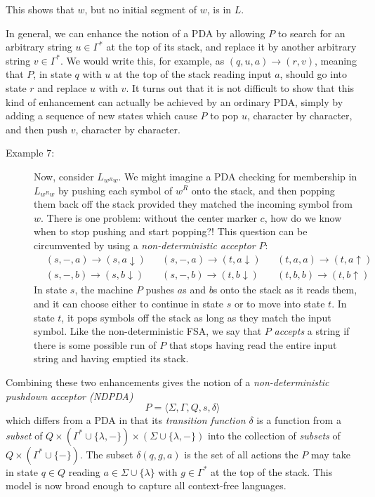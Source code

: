 \documentclass{article}
\begin{document}
\begin{description}
  This shows that $w$, but no initial segment of $w$, is in $L$.

\end{description}

In general, we can enhance the notion of a PDA by allowing $P$ to search for an arbitrary string $u \in \Gamma^*$ at the top of its stack, and replace it by another arbitrary string $v \in \Gamma^*$. We would write this, for example, as $(q,u,a) \to (r,v)$, meaning that $P$, in state $q$ with $u$ at the top of the stack reading input $a$, should go into state $r$ and replace $u$ with $v$. It turns out that it is not difficult to show that this kind of enhancement can actually be achieved by an ordinary PDA, simply by adding a sequence of new states which cause $P$ to pop $u$, character by character, and then push $v$, character by character.

\begin{description}

\item[Example 7:] Now, consider $L_{w^Rw}$. We might imagine a PDA checking for membership in $L_{w^Rw}$ by pushing each symbol of $w^R$ onto the stack, and then popping them back off the stack provided they matched the incoming symbol from $w$. There is one problem: without the center marker $c$, how do we know when to stop pushing and start popping?! This question can be circumvented by using a \emph{non-deterministic acceptor} $P$:
  \begin{align*}
  & (s,-,a) \to (s,a \downarrow) & & (s,-,a) \to (t,a \downarrow) & & (t,a,a) \to (t,a \uparrow) \\
  & (s,-,b) \to (s,b \downarrow) & & (s,-,b) \to (t,b \downarrow) & & (t,b,b) \to (t,b \uparrow)
  \end{align*}
  In state $s$, the machine $P$ pushes $a$s and $b$s onto the stack as it reads them, and it can choose either to continue in state $s$ or to move into state $t$. In state $t$, it pops symbols off the stack as long as they match the input symbol. Like the non-deterministic FSA, we say that $P$ \emph{accepts} a string if there is some possible run of $P$ that stops having read the entire input string and having emptied its stack.

\end{description}

Combining these two enhancements gives the notion of a \emph{non-deterministic pushdown acceptor (NDPDA)}
\begin{equation*}
P = \langle \Sigma, \Gamma, Q, s, \delta \rangle
\end{equation*}
which differs from a PDA in that its \emph{transition function} $\delta$ is a function from a \emph{subset} of $Q \times (\Gamma^* \cup \{\lambda,-\}) \times (\Sigma \cup \{\lambda,-\})$ into the collection of \emph{subsets} of $Q \times (\Gamma^* \cup \{-\})$. The subset $\delta(q,g,a)$ is the set of all actions the $P$ may take in state $q \in Q$ reading $a \in \Sigma \cup \{\lambda\}$ with $g \in \Gamma^*$ at the top of the stack. This model is now broad enough to capture all context-free languages.
\end{document}
